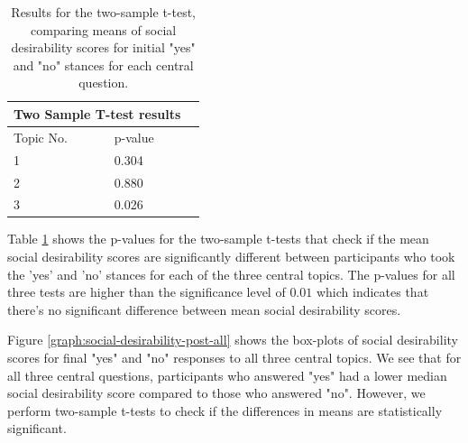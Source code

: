 \documentclass{scrartcl}
\begin{document}
\begin{table}[ht]
    \centering
    \begin{tabular}{llr}
\hline
\multicolumn{2}{c}{\textbf{Two Sample T-test results}} \\
\hline
Topic No.    & p-value \\
\hline
1   &   0.304   \\
2   &   0.880   \\
3   &   0.026   \\
\hline
\end{tabular}
    \caption{Results for the two-sample t-test, comparing means of social desirability scores for initial "yes" and "no" stances for each central question.}
    \label{tab:twosample-ttest-results}
\end{table}

Table \ref{tab:twosample-ttest-results} shows the p-values for the two-sample t-tests that check if the mean social desirability scores are significantly different between participants who took the 'yes' and 'no' stances for each of the three central topics. The p-values for all three tests are higher than the significance level of $0.01$ which indicates that there's no significant difference between mean social desirability scores.

Figure \ref{graph:social-desirability-post-all} shows the box-plots of social desirability scores for final "yes" and "no" responses to all three central topics. We see that for all three central questions, participants who answered "yes" had a lower median social desirability score compared to those who answered "no". However, we perform two-sample t-tests to check if the differences in means are statistically significant.
\end{document}
